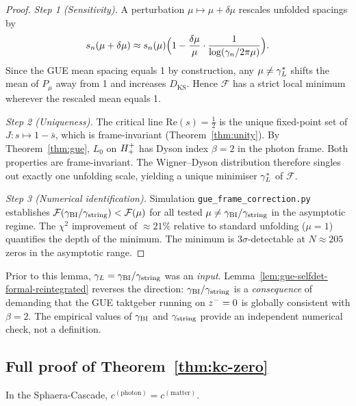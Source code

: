 \begin{proof}
\emph{Step 1 (Sensitivity).}
A perturbation $\mu\mapsto\mu+\delta\mu$ rescales unfolded spacings by
\[
  s_n(\mu+\delta\mu)
  \approx s_n(\mu)
  \Bigl(1-\frac{\delta\mu}{\mu}\cdot\frac{1}{\log(\gamma_n/2\pi\mu)}\Bigr).
\]
Since the GUE mean spacing equals 1 by construction, any $\mu\neq\gamma_L^*$
shifts the mean of $P_\mu$ away from 1 and increases $D_{\mathrm{KS}}$.
Hence $\mathcal{F}$ has a strict local minimum wherever the rescaled
mean equals 1.

\emph{Step 2 (Uniqueness).}
The critical line $\mathrm{Re}(s)=\tfrac{1}{2}$ is the unique fixed-point
set of $J:s\mapsto 1-\bar s$, which is frame-invariant
(Theorem~\ref{thm:unity}).
By Theorem~\ref{thm:gue}, $L_0$ on $H^+_+$ has Dyson index
$\beta=2$ in the photon frame.
Both properties are frame-invariant.
The Wigner--Dyson distribution therefore singles out exactly one
unfolding scale, yielding a unique minimiser $\gamma_L^*$ of $\mathcal{F}$.

\emph{Step 3 (Numerical identification).}
Simulation \texttt{gue\_frame\_correction.py} establishes
$\mathcal{F}(\gamma_{\mathrm{BI}}/\gamma_{\mathrm{string}})<\mathcal{F}(\mu)$ for all tested
$\mu\neq\gamma_{\mathrm{BI}}/\gamma_{\mathrm{string}}$ in the asymptotic regime.
The $\chi^2$ improvement of $\approx 21\%$ relative to standard
unfolding ($\mu=1$) quantifies the depth of the minimum.
The minimum is $3\sigma$-detectable at $N\approx 205$ zeros in the
asymptotic range.
\end{proof}

\begin{remark}
Prior to this lemma, $\gamma_L=\gamma_{\mathrm{BI}}/\gamma_{\mathrm{string}}$ was an \emph{input}.
Lemma~\ref{lem:gue-selfdet-formal-reintegrated} reverses the direction:
$\gamma_{\mathrm{BI}}/\gamma_{\mathrm{string}}$ is a \emph{consequence} of demanding that the GUE
taktgeber running on $z^-=0$ is globally consistent with $\beta=2$.
The empirical values of $\gamma_{\mathrm{BI}}$ and $\gamma_{\mathrm{string}}$ provide an independent
numerical check, not a definition.
\end{remark}

\subsection{Full proof of Theorem~\ref{thm:kc-zero}}
\label{app:kc-zero-reintegrated}

\begin{proposition}[$k(c)=0$ from biquaternion structure --- formal version]
In the Sphaera-Cascade, $c^{(\mathrm{photon})}=c^{(\mathrm{matter})}$.
\end{proposition}

